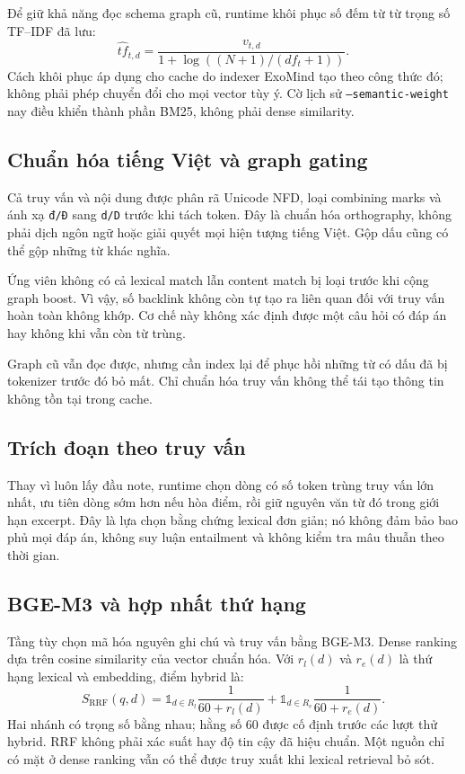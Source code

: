 \documentclass[11pt,a4paper]{article}
\begin{document}
Để giữ khả năng đọc schema graph cũ, runtime khôi phục số đếm từ từ trọng số TF--IDF đã lưu:
\begin{equation}
\widehat{tf}_{t,d}=\frac{v_{t,d}}{1+\log((N+1)/(df_t+1))}.
\end{equation}
Cách khôi phục áp dụng cho cache do indexer ExoMind tạo theo công thức đó; không phải phép chuyển đổi cho mọi vector tùy ý. Cờ lịch sử \texttt{--semantic-weight} nay điều khiển thành phần BM25, không phải dense similarity.

\subsection{Chuẩn hóa tiếng Việt và graph gating}
Cả truy vấn và nội dung được phân rã Unicode NFD, loại combining marks và ánh xạ \texttt{đ/Đ} sang \texttt{d/D} trước khi tách token. Đây là chuẩn hóa orthography, không phải dịch ngôn ngữ hoặc giải quyết mọi hiện tượng tiếng Việt. Gộp dấu cũng có thể gộp những từ khác nghĩa.

Ứng viên không có cả lexical match lẫn content match bị loại trước khi cộng graph boost. Vì vậy, số backlink không còn tự tạo ra liên quan đối với truy vấn hoàn toàn không khớp. Cơ chế này không xác định được một câu hỏi có đáp án hay không khi vẫn còn từ trùng.

Graph cũ vẫn đọc được, nhưng cần index lại để phục hồi những từ có dấu đã bị tokenizer trước đó bỏ mất. Chỉ chuẩn hóa truy vấn không thể tái tạo thông tin không tồn tại trong cache.

\subsection{Trích đoạn theo truy vấn}
Thay vì luôn lấy đầu note, runtime chọn dòng có số token trùng truy vấn lớn nhất, ưu tiên dòng sớm hơn nếu hòa điểm, rồi giữ nguyên văn từ đó trong giới hạn excerpt. Đây là lựa chọn bằng chứng lexical đơn giản; nó không đảm bảo bao phủ mọi đáp án, không suy luận entailment và không kiểm tra mâu thuẫn theo thời gian.

\subsection{BGE-M3 và hợp nhất thứ hạng}
Tầng tùy chọn mã hóa nguyên ghi chú và truy vấn bằng BGE-M3. Dense ranking dựa trên cosine similarity của vector chuẩn hóa. Với $r_l(d)$ và $r_e(d)$ là thứ hạng lexical và embedding, điểm hybrid là:
\begin{equation}
S_{\mathrm{RRF}}(q,d)=\mathbb{1}_{d\in R_l}\frac{1}{60+r_l(d)}+
\mathbb{1}_{d\in R_e}\frac{1}{60+r_e(d)}.
\end{equation}
Hai nhánh có trọng số bằng nhau; hằng số 60 được cố định trước các lượt thử hybrid. RRF không phải xác suất hay độ tin cậy đã hiệu chuẩn. Một nguồn chỉ có mặt ở dense ranking vẫn có thể được truy xuất khi lexical retrieval bỏ sót.
\end{document}
